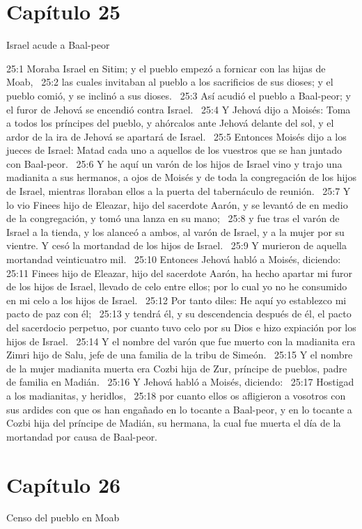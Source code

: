 \section*{Capítulo 25}
Israel acude a Baal-peor 

25:1 Moraba Israel en Sitim; y el pueblo empezó a fornicar con las hijas de Moab,  
25:2 las cuales invitaban al pueblo a los sacrificios de sus dioses; y el pueblo comió, y se inclinó a sus dioses.  
25:3 Así acudió el pueblo a Baal-peor; y el furor de Jehová se encendió contra Israel.  
25:4 Y Jehová dijo a Moisés: Toma a todos los príncipes del pueblo, y ahórcalos ante Jehová delante del sol, y el ardor de la ira de Jehová se apartará de Israel.  
25:5 Entonces Moisés dijo a los jueces de Israel: Matad cada uno a aquellos de los vuestros que se han juntado con Baal-peor.  
25:6 Y he aquí un varón de los hijos de Israel vino y trajo una madianita a sus hermanos, a ojos de Moisés y de toda la congregación de los hijos de Israel, mientras lloraban ellos a la puerta del tabernáculo de reunión.  
25:7 Y lo vio Finees hijo de Eleazar, hijo del sacerdote Aarón, y se levantó de en medio de la congregación, y tomó una lanza en su mano;  
25:8 y fue tras el varón de Israel a la tienda, y los alanceó a ambos, al varón de Israel, y a la mujer por su vientre. Y cesó la mortandad de los hijos de Israel.  
25:9 Y murieron de aquella mortandad veinticuatro mil.  
25:10 Entonces Jehová habló a Moisés, diciendo:  
25:11 Finees hijo de Eleazar, hijo del sacerdote Aarón, ha hecho apartar mi furor de los hijos de Israel, llevado de celo entre ellos; por lo cual yo no he consumido en mi celo a los hijos de Israel.  
25:12 Por tanto diles: He aquí yo establezco mi pacto de paz con él;  
25:13 y tendrá él, y su descendencia después de él, el pacto del sacerdocio perpetuo, por cuanto tuvo celo por su Dios e hizo expiación por los hijos de Israel.  
25:14 Y el nombre del varón que fue muerto con la madianita era Zimri hijo de Salu, jefe de una familia de la tribu de Simeón.  
25:15 Y el nombre de la mujer madianita muerta era Cozbi hija de Zur, príncipe de pueblos, padre de familia en Madián.  
25:16 Y Jehová habló a Moisés, diciendo:  
25:17 Hostigad a los madianitas, y heridlos,  
25:18 por cuanto ellos os afligieron a vosotros con sus ardides con que os han engañado en lo tocante a Baal-peor, y en lo tocante a Cozbi hija del príncipe de Madián, su hermana, la cual fue muerta el día de la mortandad por causa de Baal-peor.  
\section*{Capítulo 26}
Censo del pueblo en Moab  

